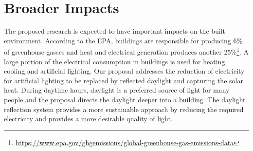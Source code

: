 \section{Broader Impacts}
\label{sec:broader}

The proposed research is expected to have important impacts on the built environment.
According to the EPA, buildings are responsible for producing 6\% of
greenhouse gasses and heat and electrical generation produces another
25\%\footnote{\url{https://www.epa.gov/ghgemissions/global-greenhouse-gas-emissions-data}}.
A large portion of the electrical consumption in buildings is used for
heating, cooling and artificial lighting. Our proposal addresses the
reduction of electricity for artificial lighting to be replaced by
reflected daylight and capturing the solar heat. During daytime hours,
daylight is a preferred source of light for many people and the proposal
directs the daylight deeper into a building. The daylight reflection system
provides a more sustainable approach by reducing the required electricity
and provides a more desirable quality of light.

